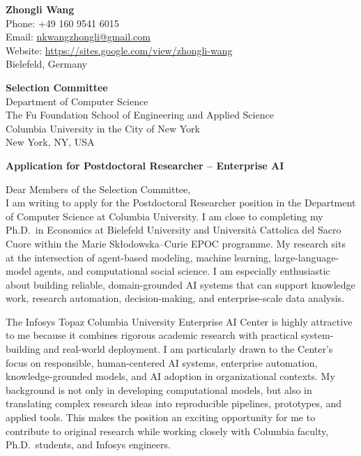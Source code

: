 \documentclass[11pt]{article}
\begin{document}
\begin{flushright}
\textbf{Zhongli Wang} \\
Phone: +49 160 9541 6015 \\
Email: \href{mailto:nkwangzhongli@gmail.com}{nkwangzhongli@gmail.com} \\
Website: \href{https://sites.google.com/view/zhongli-wang}{https://sites.google.com/view/zhongli-wang} \\
Bielefeld, Germany \\
\end{flushright}

\vspace{0.25cm}

\noindent
\textbf{Selection Committee} \\
Department of Computer Science \\
The Fu Foundation School of Engineering and Applied Science \\
Columbia University in the City of New York \\
New York, NY, USA \\

\vspace{0.25cm}

\noindent
\textbf{Application for Postdoctoral Researcher -- Enterprise AI}

\vspace{0.15cm}

\noindent Dear Members of the Selection Committee,\\[0.1cm]

I am writing to apply for the Postdoctoral Researcher position in the Department of Computer Science at Columbia University. I am close to completing my Ph.D.\ in Economics at Bielefeld University and Universit\`a Cattolica del Sacro Cuore within the Marie Sk{\l}odowska--Curie EPOC programme. My research sits at the intersection of agent-based modeling, machine learning, large-language-model agents, and computational social science. I am especially enthusiastic about building reliable, domain-grounded AI systems that can support knowledge work, research automation, decision-making, and enterprise-scale data analysis.

The Infosys Topaz Columbia University Enterprise AI Center is highly attractive to me because it combines rigorous academic research with practical system-building and real-world deployment. I am particularly drawn to the Center's focus on responsible, human-centered AI systems, enterprise automation, knowledge-grounded models, and AI adoption in organizational contexts. My background is not only in developing computational models, but also in translating complex research ideas into reproducible pipelines, prototypes, and applied tools. This makes the position an exciting opportunity for me to contribute to original research while working closely with Columbia faculty, Ph.D.\ students, and Infosys engineers.
\end{document}

